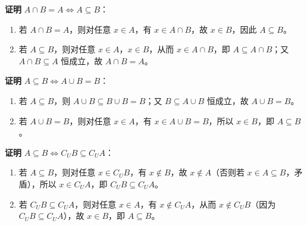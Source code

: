 \begin{proofbox}
\textbf{证明} $A\cap B = A \Leftrightarrow A\subseteq B$：
\begin{enumerate}
    \item[($\Rightarrow$)] 若 $A\cap B = A$，则对任意 $x\in A$，有 $x\in A\cap B$，故 $x\in B$，因此 $A\subseteq B$。
    \item[($\Leftarrow$)] 若 $A\subseteq B$，则对任意 $x\in A$，$x\in B$，从而 $x\in A\cap B$，即 $A\subseteq A\cap B$；又 $A\cap B\subseteq A$ 恒成立，故 $A\cap B = A$。
\end{enumerate}
\end{proofbox}

\begin{proofbox}
\textbf{证明} $A\subseteq B \Leftrightarrow A\cup B = B$：
\begin{enumerate}
    \item[($\Rightarrow$)] 若 $A\subseteq B$，则 $A\cup B \subseteq B\cup B = B$；又 $B\subseteq A\cup B$ 恒成立，故 $A\cup B = B$。
    \item[($\Leftarrow$)] 若 $A\cup B = B$，则对任意 $x\in A$，有 $x\in A\cup B = B$，所以 $x\in B$，即 $A\subseteq B$。
\end{enumerate}
\end{proofbox}

\begin{proofbox}
\textbf{证明} $A\subseteq B \Leftrightarrow C_U B \subseteq C_U A$：
\begin{enumerate}
    \item[($\Rightarrow$)] 若 $A\subseteq B$，则对任意 $x\in C_U B$，有 $x\notin B$，故 $x\notin A$（否则若 $x\in A\subseteq B$，矛盾），所以 $x\in C_U A$，即 $C_U B \subseteq C_U A$。
    \item[($\Leftarrow$)] 若 $C_U B \subseteq C_U A$，则对任意 $x\in A$，有 $x\notin C_U A$，从而 $x\notin C_U B$（因为 $C_U B\subseteq C_U A$），故 $x\in B$，即 $A\subseteq B$。
\end{enumerate}
\end{proofbox}